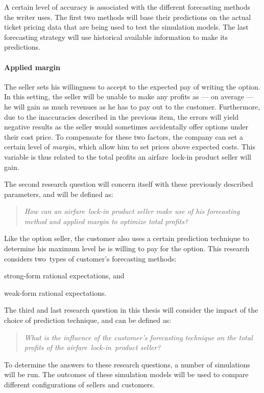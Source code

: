 A certain level of accuracy is associated with the different forecasting methods the writer uses. The first two methods will base their predictions on the actual ticket pricing data that are being used to test the simulation models. The last forecasting strategy will use historical available information to make its predictions.

\paragraph{Applied margin} The seller sets his willingness to accept to the expected pay of writing the option. In this setting, the seller will be unable to make any profits as --- on average --- he will gain as much revenues as he has to pay out to the customer. Furthermore, due to the inaccuracies described in the previous item, the errors will yield negative results as the seller would sometimes accidentally offer options under their cost price. To compensate for these two factors, the company can set a certain level of \emph{margin}, which allow him to set prices above expected costs. This variable is thus related to the total profits an airfare~lock-in product seller will gain.

The second research question will concern itself with these previously described parameters, and will be defined as:

\begin{quote}\emph{How can an airfare~lock-in product seller make use of his forecasting method and applied margin to optimize total profits?}\end{quote}

Like the option seller, the customer also uses a certain prediction technique to determine his maximum level he is willing to pay for the option. This research considers two~types of customer's forecasting methods:
\begin{compactitem}
    \item strong-form rational expectations, and
    \item weak-form rational expectations.
\end{compactitem}

The third and last research question in this thesis will consider the impact of the choice of prediction technique, and can be defined as:

\begin{quote}\emph{What is the influence of the customer's forecasting technique on the total profits of the airfare~lock-in~product seller?}\end{quote}

To determine the answers to these research questions, a number of simulations will be run. The outcomes of these simulation models will be used to compare different configurations of sellers and customers.
